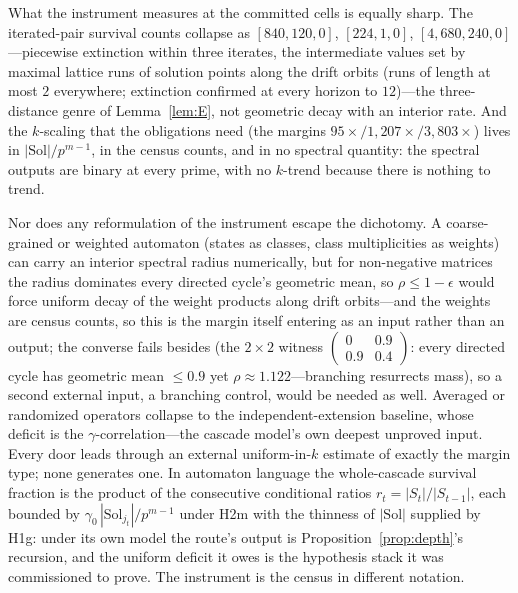 What the instrument measures at the committed cells is equally sharp.
The iterated-pair survival counts collapse as $[840,120,0]$,
$[224,1,0]$, $[4{,}680,240,0]$---piecewise extinction within three
iterates, the intermediate values set by maximal lattice runs of
solution points along the drift orbits (runs of length at most $2$
everywhere; extinction confirmed at every horizon to $12$)---the
three-distance genre of Lemma~\ref{lem:E}, not geometric decay with
an interior rate. And the $k$-scaling that the obligations need (the
margins $95\times/1{,}207\times/3{,}803\times$) lives in
$|\mathrm{Sol}|/p^{m-1}$, in the census counts, and in no spectral
quantity: the spectral outputs are binary at every prime, with no
$k$-trend because there is nothing to trend.

Nor does any reformulation of the instrument escape the dichotomy. A
coarse-grained or weighted automaton (states as classes, class
multiplicities as weights) can carry an interior spectral radius
numerically, but for non-negative matrices the radius dominates every
directed cycle's geometric mean, so $\rho\le 1-\epsilon$ would force
uniform decay of the weight products along drift orbits---and the
weights are census counts, so this is the margin itself entering as an
input rather than an output; the converse fails besides (the $2\times2$
witness $\left(\begin{smallmatrix}0&0.9\\0.9&0.4\end{smallmatrix}
\right)$: every directed cycle has geometric mean $\le 0.9$ yet
$\rho\approx 1.122$---branching resurrects mass), so a second external
input, a branching control, would be needed as well. Averaged or
randomized operators collapse to the independent-extension baseline,
whose deficit is the $\gamma$-correlation---the cascade model's own
deepest unproved input. Every door leads through an external
uniform-in-$k$ estimate of exactly the margin type; none generates
one. In automaton language the whole-cascade survival fraction is the
product of the consecutive conditional ratios $r_t=|S_t|/|S_{t-1}|$,
each bounded by $\gamma_0\,|\mathrm{Sol}_{j_t}|/p^{m-1}$ under H2m
with the thinness of $|\mathrm{Sol}|$ supplied by H1g: under its own
model the route's output is Proposition~\ref{prop:depth}'s recursion,
and the uniform deficit it owes is the hypothesis stack it was
commissioned to prove. The instrument is the census in different
notation.


